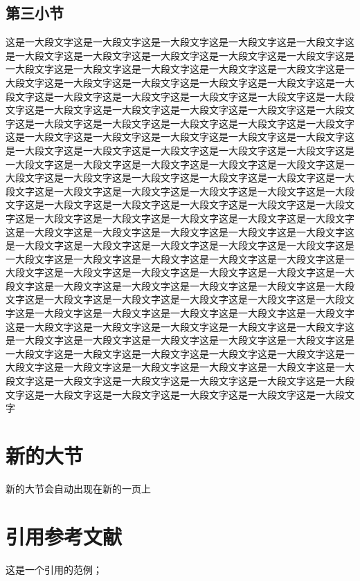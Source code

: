 \documentclass{HustGraduPaper}
\begin{document}
	\subsection{第三小节}
	这是一大段文字这是一大段文字这是一大段文字这是一大段文字这是一大段文字这是一大段文字这是一大段文字这是一大段文字这是一大段文字这是一大段文字这是一大段文字这是一大段文字这是一大段文字这是一大段文字这是一大段文字这是一大段文字这是一大段文字这是一大段文字这是一大段文字这是一大段文字这是一大段文字这是一大段文字这是一大段文字这是一大段文字这是一大段文字这是一大段文字这是一大段文字这是一大段文字这是一大段文字这是一大段文字这是一大段文字这是一大段文字这是一大段文字这是一大段文字这是一大段文字这是一大段文字这是一大段文字这是一大段文字这是一大段文字这是一大段文字这是一大段文字这是一大段文字这是一大段文字这是一大段文字这是一大段文字这是一大段文字这是一大段文字这是一大段文字这是一大段文字这是一大段文字这是一大段文字这是一大段文字这是一大段文字这是一大段文字这是一大段文字这是一大段文字这是一大段文字这是一大段文字这是一大段文字这是一大段文字这是一大段文字这是一大段文字这是一大段文字这是一大段文字这是一大段文字这是一大段文字这是一大段文字这是一大段文字这是一大段文字这是一大段文字这是一大段文字这是一大段文字这是一大段文字这是一大段文字这是一大段文字这是一大段文字这是一大段文字这是一大段文字这是一大段文字这是一大段文字这是一大段文字这是一大段文字这是一大段文字这是一大段文字这是一大段文字这是一大段文字这是一大段文字这是一大段文字这是一大段文字这是一大段文字这是一大段文字这是一大段文字这是一大段文字这是一大段文字这是一大段文字这是一大段文字这是一大段文字这是一大段文字这是一大段文字这是一大段文字这是一大段文字这是一大段文字这是一大段文字这是一大段文字这是一大段文字这是一大段文字这是一大段文字这是一大段文字这是一大段文字这是一大段文字这是一大段文字这是一大段文字这是一大段文字这是一大段文字这是一大段文字这是一大段文字这是一大段文字这是一大段文字这是一大段文字这是一大段文字这是一大段文字这是一大段文字这是一大段文字这是一大段文字这是一大段文字这是一大段文字这是一大段文字这是一大段文字这是一大段文字这是一大段文字这是一大段文字这是一大段文字这是一大段文字这是一大段文字这是一大段文字这是一大段文字这是一大段文字这是一大段文字这是一大段文字
	\section{新的大节}
	新的大节会自动出现在新的一页上
	\section{引用参考文献}
	这是一个引用的范例\cite{Stone_1998}；
	
\end{document}
